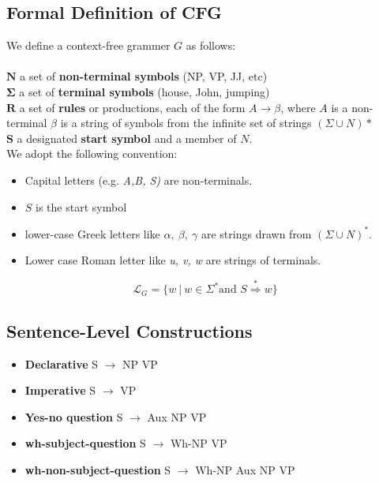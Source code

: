 \documentclass[11pt]{article}
\begin{document}
			\subsection*{Formal Definition of CFG}
				We define a context-free grammer $G$ as follows: \\ \\
				$\boldsymbol N$ a set of \textbf{non-terminal symbols} (NP, VP, JJ, etc)\\
				$\boldsymbol \Sigma$ a set of \textbf{terminal symbols} (house, John, jumping)\\
				$\boldsymbol R$ a set of \textbf{rules} or productions, each of the form $A \rightarrow \beta $, where $A$ is a 
							non-terminal $\beta$ is a string \indent of symbols from the infinite set of strings 
							$(\Sigma \cup N)\ast$ \\
				$\boldsymbol S$ a designated \textbf{start symbol} and a member of $N$. \\ 
			
			\noindent We adopt the following convention: 
			\begin{itemize}
			\setlength\itemsep{.2em}
				\item Capital letters (e.g. \textit{A,B, S)} are non-terminals. 
				\item $S$ is the start symbol
				\item lower-case Greek letters like $\alpha,\ \beta, \ \gamma$  are strings drawn from $(\Sigma \cup N)^*$. 
				\item Lower case Roman letter like \textit{u, v, w} are strings of terminals.
			\end{itemize}

			$$\mathcal L_G = \{w \ | \ w \in \Sigma^* \text{and } S \overset{*}{\Rightarrow} w \}$$
				
			\subsection*{Sentence-Level Constructions}
				\begin{itemize}
					\item \textbf{Declarative} S $\rightarrow$ NP VP
					\item \textbf{Imperative} S $\rightarrow$ VP
					\item \textbf{Yes-no question} S $\rightarrow$ Aux NP VP
					\item \textbf{wh-subject-question} S $\rightarrow$ Wh-NP VP
					\item \textbf{wh-non-subject-question} S $\rightarrow$ Wh-NP Aux NP VP
				\end{itemize}
	
\end{document}
